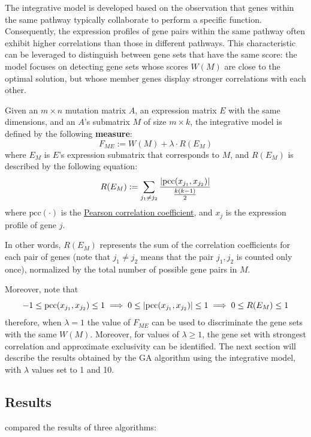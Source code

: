 The integrative model is developed based on the observation that genes within the same pathway typically collaborate to perform a specific function. Consequently, the expression profiles of gene pairs within the same pathway often exhibit higher correlations than those in different pathways. This characteristic can be leveraged to distinguish between gene sets that have the same score: the model focuses on detecting gene sets whose scores $W(M)$ are close to the optimal solution, but whose member genes display stronger correlations with each other.

\begin{definition}
    Given an $m \times n$ mutation matrix $A$, an expression matrix $E$ with the same dimensions, and an $A$'s submatrix $M$ of size $m \times k$, the integrative model is defined by the following \textbf{measure}: $$F_{ME} := W(M) + \lambda \cdot R(E_M)$$ where $E_M$ is $E$'s expression submatrix that corresponds to $M$, and $R(E_M)$ is described by the following equation: $$R(E_M) := \sum_{j_1 \neq j_2} {\dfrac{\left|\mathrm{pcc}(x_{j_1}, x_{j_2})\right|}{\frac{k(k - 1)}{2}}}$$ where $\mathrm{pcc}(\cdot)$ is the \href{https://en.wikipedia.org/wiki/Pearson_correlation_coefficient}{Pearson correlation coefficient}, and $x_j$ is the expression profile of gene $j$.
\end{definition}

In other words, $R(E_M)$ represents the sum of the correlation coefficients for each pair of genes (note that $j_1 \neq j_2$ means that the pair $j_1, j_2$ is counted only once), normalized by the total number of possible gene pairs in $M$.

Moreover, note that $$-1 \le \mathrm{pcc}(x_{j_1}, x_{j_2}) \le 1 \implies 0 \le \left|\mathrm{pcc}(x_{j_1}, x_{j_2})\right| \le 1 \implies 0 \le R(E_M) \le 1$$ therefore, when $\lambda = 1$ the value of $F_{ME}$ can be used to discriminate the gene sets with the same $W(M)$. Moreover, for values of $\lambda \ge 1$, the gene set with strongest correlation and approximate exclusivity can be identified. The next section will describe the results obtained by the GA algorithm using the integrative model, with $\lambda$ values set to 1 and 10.

\subsection{Results}

\textcite{mdpfinder} compared the results of three algorithms:

